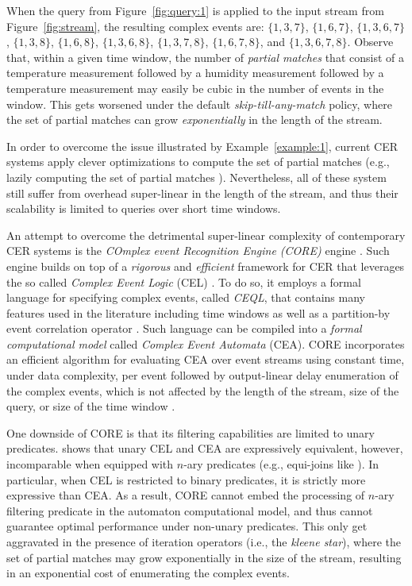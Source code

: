 \begin{example}
When the query from Figure~\ref{fig:query:1} is applied to the input stream from Figure~\ref{fig:stream}, the resulting complex events are: $\{ 1, 3, 7 \}$, $\{ 1, 6, 7 \}$, $\{ 1, 3, 6, 7 \}$, $\{ 1, 3, 8 \}$, $\{ 1, 6, 8 \}$, $\{ 1, 3, 6, 8 \}$, $\{ 1, 3, 7, 8\}$, $\{ 1, 6, 7, 8\}$, and $\{ 1, 3, 6, 7, 8\}$. Observe that, within a given time window, the number of \emph{partial matches} that consist of a temperature measurement followed by a humidity measurement followed by a temperature measurement may easily be cubic in the number of events in the window. This gets worsened under the default \emph{skip-till-any-match} \cite{skip-till-any-match} policy, where the set of partial matches can grow \emph{exponentially} in the length of the stream.
\end{example}

In order to overcome the issue illustrated by Example~\ref{example:1}, current CER systems apply clever optimizations to compute the set of partial matches (e.g., lazily computing the set of partial matches \cite{core}). Nevertheless, all of these system still suffer from overhead super-linear in the length of the stream, and thus their scalability is limited to queries over short time windows.

An attempt to overcome the detrimental super-linear complexity of contemporary CER systems is the \emph{COmplex event Recognition Engine (CORE)} engine \cite{core}. Such engine builds on top of a \emph{rigorous} and \emph{efficient} framework for CER that leverages the so called \emph{Complex Event Logic} (CEL) \cite{formal-framework-cep, formal-framework-cer}. To do so, it employs a formal language for specifying complex events, called \emph{CEQL}, that contains many features used in the literature including time windows as well as a partition-by event correlation operator \cite{on-the-expressiveness, core}. Such language can be compiled into a \emph{formal computational model} called \emph{Complex Event Automata} (CEA). CORE incorporates an efficient algorithm for evaluating CEA over event streams using constant time, under data complexity, per event followed by output-linear delay enumeration of the complex events, which is not affected by the length of the stream, size of the query, or size of the time window \cite{formal-framework-cer, core}.

One downside of CORE is that its filtering capabilities are limited to unary predicates. \cite{on-the-expressiveness} shows that unary CEL and CEA are expressively equivalent, however, incomparable when equipped with $n$-ary predicates (e.g., equi-joins like ). In particular, when CEL is restricted to binary predicates, it is strictly more expressive than CEA. As a result, CORE cannot embed the processing of $n$-ary filtering predicate in the automaton computational model, and thus cannot guarantee optimal performance under non-unary predicates. This only get aggravated in the presence of iteration operators (i.e., the \emph{kleene star}), where the set of partial matches may grow exponentially in the size of the stream, resulting in an exponential cost of enumerating the complex events.

